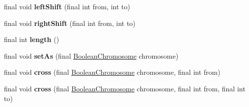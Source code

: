 \begin{CompactItemize}
\item 
\hypertarget{classjenes_1_1chromosome_1_1_boolean_chromosome_96c0fb9c3f1668cbc9ca175a183f69d4}{
final void \textbf{leftShift} (final int from, int to)}
\label{classjenes_1_1chromosome_1_1_boolean_chromosome_96c0fb9c3f1668cbc9ca175a183f69d4}

\item 
\hypertarget{classjenes_1_1chromosome_1_1_boolean_chromosome_866689aeafc1b4a5e83c14a1605bc7ce}{
final void \textbf{rightShift} (final int from, int to)}
\label{classjenes_1_1chromosome_1_1_boolean_chromosome_866689aeafc1b4a5e83c14a1605bc7ce}

\item 
\hypertarget{classjenes_1_1chromosome_1_1_boolean_chromosome_4665770a8e625c26f3704b41fecb10f8}{
final int \textbf{length} ()}
\label{classjenes_1_1chromosome_1_1_boolean_chromosome_4665770a8e625c26f3704b41fecb10f8}

\item 
\hypertarget{classjenes_1_1chromosome_1_1_boolean_chromosome_16d9851ba21583010d003378a7d59d19}{
final void \textbf{setAs} (final \hyperlink{classjenes_1_1chromosome_1_1_boolean_chromosome}{BooleanChromosome} chromosome)}
\label{classjenes_1_1chromosome_1_1_boolean_chromosome_16d9851ba21583010d003378a7d59d19}

\item 
\hypertarget{classjenes_1_1chromosome_1_1_boolean_chromosome_a1c3c421b6e8e6db44fb7cce7443e669}{
final void \textbf{cross} (final \hyperlink{classjenes_1_1chromosome_1_1_boolean_chromosome}{BooleanChromosome} chromosome, final int from)}
\label{classjenes_1_1chromosome_1_1_boolean_chromosome_a1c3c421b6e8e6db44fb7cce7443e669}

\item 
\hypertarget{classjenes_1_1chromosome_1_1_boolean_chromosome_f31ce0ed4f82fccd837cfde93bc4ee61}{
final void \textbf{cross} (final \hyperlink{classjenes_1_1chromosome_1_1_boolean_chromosome}{BooleanChromosome} chromosome, final int from, final int to)}
\label{classjenes_1_1chromosome_1_1_boolean_chromosome_f31ce0ed4f82fccd837cfde93bc4ee61}


\end{CompactItemize}
